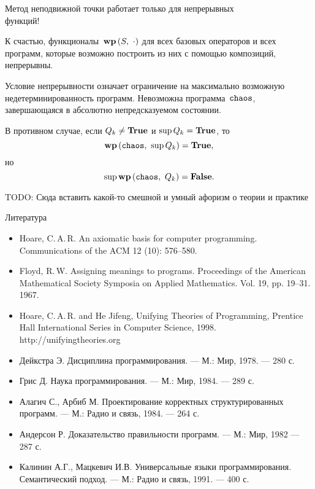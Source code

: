 \documentclass[landscape]{slides}
\begin{document}
\begin{slide}
        Метод неподвижной точки работает только для непрерывных\\функций!

        К счастью, функционалы~$\mathbf{wp}\left({S},\ {\cdot}\right)$ для всех базовых операторов и всех программ,
        которые возможно построить из них с помощью композиций, непрерывны.

        Условие непрерывности означает ограничение на максимально возможную недетерминированность
        программ. Невозможна программа~$\mathtt{chaos}$, завершающаяся в абсолютно непредсказуемом состоянии.

        В противном случае, если $Q_k\ne\mathbf{True}$ и $\sup Q_k = \mathbf{True}$, то
        \[
                \mathbf{wp}\left({\mathtt{chaos}},\ {\sup Q_k}\right) = \mathbf{True},
        \]
        но
        \[
                \sup \mathbf{wp}\left({\mathtt{chaos}},\ {Q_k}\right) = \mathbf{False}.
        \]
\end{slide}

\begin{slide}
    \begin{center}
        \begin{LARGE}
            TODO: Сюда вставить какой-то смешной и умный афоризм о теории и практике
        \end{LARGE}
    \end{center}
\end{slide}

\begin{slide}
Литература
\begin{itemize}
\item Hoare, C.\,A.\,R. An axiomatic basis for computer programming.\\Communications of the ACM 12 (10): 576–580.
\item Floyd, R.\,W. Assigning meanings to programs. Proceedings of the American Mathematical Society Symposia on Applied Mathematics. Vol. 19, pp. 19–31. 1967.
\item Hoare, C.\,A.\,R. and He Jifeng, Unifying Theories of Programming, Prentice Hall International Series in Computer Science, 1998.\\http://unifyingtheories.org
\end{itemize}
\end{slide}

\begin{slide}
\begin{itemize}
\item Дейкстра Э. Дисциплина программирования. — М.: Мир, 1978. — 280 с.
\item Грис Д. Наука программирования. — М.: Мир, 1984. — 289 с.
\item Алагич С., Арбиб М. Проектирование корректных структурированных программ. — М.: Радио и связь, 1984. — 264 с.
\item Андерсон Р. Доказательство правильности программ. — М.: Мир, 1982 — 287 с.
\item Калинин А.Г., Мацкевич И.В. Универсальные языки программирования. Семантический подход. — М.: Радио и связь, 1991. — 400 с.
\end{itemize}
\end{slide}
\end{document}
